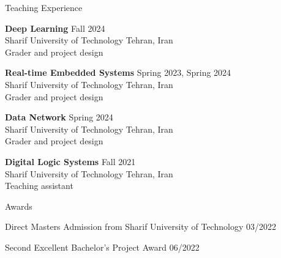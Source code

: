 \documentclass{resume} %
\begin{document}
\begin{rSection}{Teaching Experience}
\vspace{-1.25em}
\item \textbf{Deep Learning} \hfill Fall 2024\\
Sharif University of Technology \hfill Tehran, Iran\\
Grader and project design
\item \textbf{Real-time Embedded Systems} \hfill Spring 2023, Spring 2024\\
Sharif University of Technology \hfill Tehran, Iran\\
Grader and project design
\item \textbf{Data Network} \hfill Spring 2024\\
Sharif University of Technology \hfill Tehran, Iran \\
Grader and project design
\item \textbf{Digital Logic Systems} \hfill Fall 2021\\
Sharif University of Technology \hfill Tehran, Iran\\
Teaching assistant
\end{rSection} 

\begin{rSection}{Awards}
\vspace{-1.25em}
\item Direct Masters Admission from Sharif University of Technology \hfill 03/2022
\item Second Excellent Bachelor's Project Award \hfill 06/2022
\end{rSection} 
\end{document}
